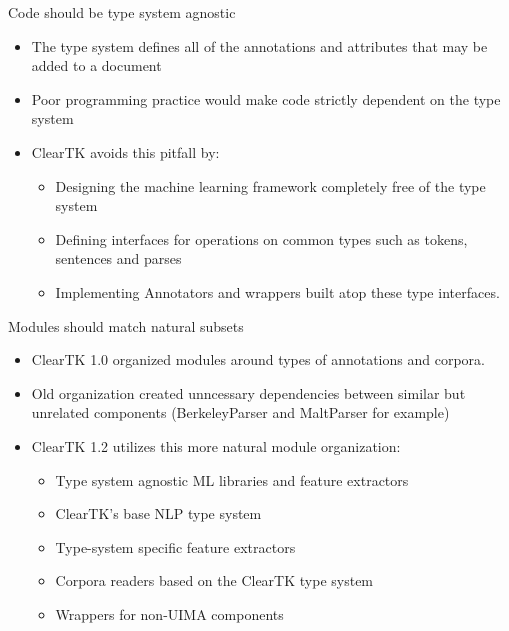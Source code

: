 \documentclass[final]{beamer}
\begin{document}
\begin{frame}{}
\begin{columns}[t]
  \begin{column}{.45\linewidth}
    \begin{block}{Code should be type system agnostic}
    \begin{itemize}
            \item The type system defines all of the annotations and attributes that may be added to a document
            \item Poor programming practice would make code strictly dependent on the type system
            \item ClearTK avoids this pitfall by:
                    \begin{itemize}
                            \item Designing the machine learning framework completely free of the type system
                            \item Defining interfaces for operations on common types such as tokens, sentences and parses
                            \item Implementing Annotators and wrappers built atop these type interfaces.
                    \end{itemize}
    \end{itemize}
                    
    \end{block}

    \begin{block}{Modules should match natural subsets}
            \begin{itemize}
                    \item ClearTK 1.0 organized modules around types of annotations and corpora.
                    \item Old organization created unncessary dependencies between similar but unrelated components (BerkeleyParser and MaltParser for example)
                    \item ClearTK 1.2 utilizes this more natural module organization:
                            \begin{itemize}
                                    \item Type system agnostic ML libraries and feature extractors
                                    \item ClearTK's base NLP type system
                                    \item Type-system specific feature extractors
                                    \item Corpora readers based on the ClearTK type system
                                    \item Wrappers for non-UIMA components
                            \end{itemize}
            \end{itemize}
    \end{block}


\end{column}
\end{columns}
\end{frame}
\end{document}
